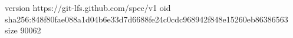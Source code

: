 version https://git-lfs.github.com/spec/v1
oid sha256:848f80fae088a1d04b6e33d7d6688fe24c0cdc968942f848e15260eb86386563
size 90062
